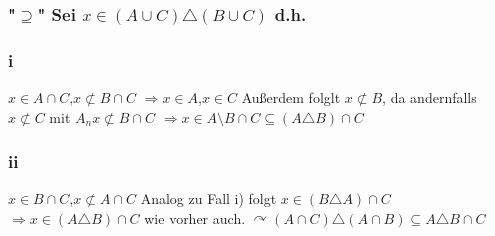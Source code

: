 \documentclass[11pt]{scrartcl}
\begin{document}
\subsubsection*{"$\supseteq$" Sei $x \in (A \cup C) \triangle (B \cup C)$ d.h.}
 
\subsubsection{i}
$x \in A \cap C$,$x \not\subset B \cap C$
$\Rightarrow x \in A$,$x \in C$
Außerdem folglt $x \not\subset B$, da andernfalls $x \not\subset C$ mit $A_n x \not\subset B \cap C$
$\Rightarrow x \in A \setminus B \cap C \subseteq (A \triangle B) \cap C$
\subsubsection{ii}
$x \in B \cap C$,$x \not\subset A \cap C$
Analog zu Fall i) folgt $x \in (B \triangle A) \cap C$
$\Rightarrow x \in (A \triangle B) \cap C$ wie vorher auch.
$\curvearrowright (A \cap C) \triangle (A \cap B) \subseteq A \triangle B \cap C$
\end{document}
